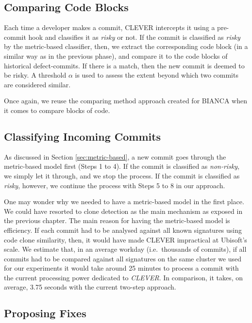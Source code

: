 \documentclass[12pt]{report}
\begin{document}
\subsection{Comparing Code Blocks}\label{sec:online}

Each time a developer makes a commit, CLEVER intercepts it using a
pre-commit hook and classifies it as \emph{risky} or not. If the commit
is classified as \emph{risky} by the metric-based classifier, then, we
extract the corresponding code block (in a similar way as in the
previous phase), and compare it to the code blocks of historical
defect-commits. If there is a match, then the new commit is deemed to be
risky. A threshold \(\alpha\) is used to assess the extent beyond which
two commits are considered similar.

Once again, we reuse the comparing method approach created for BIANCA
when it comes to compare blocks of code.

\subsection{Classifying Incoming
Commits}\label{classifying-incoming-commits}

As discussed in Section \ref{sec:metric-based}, a new commit goes
through the metric-based model first (Steps 1 to 4). If the commit is
classified as \emph{non-risky}, we simply let it through, and we stop
the process. If the commit is classified as \emph{risky}, however, we
continue the process with Steps 5 to 8 in our approach.

One may wonder why we needed to have a metric-based model in the first
place. We could have resorted to clone detection as the main mechanism
as exposed in the previous chapter. The main reason for having the
metric-based model is efficiency. If each commit had to be analysed
against all known signatures using code clone similarity, then, it would
have made CLEVER impractical at Ubisoft's scale. We estimate that, in an
average workday (i.e.~thousands of commits), if all commits had to be
compared against all signatures on the same cluster we used for our
experiments it would take around 25 minutes to process a commit with the
current processing power dedicated to \emph{CLEVER}. In comparison, it
takes, on average, 3.75 seconds with the current two-step approach.

\subsection{Proposing Fixes}\label{proposing-fixes}
\end{document}
